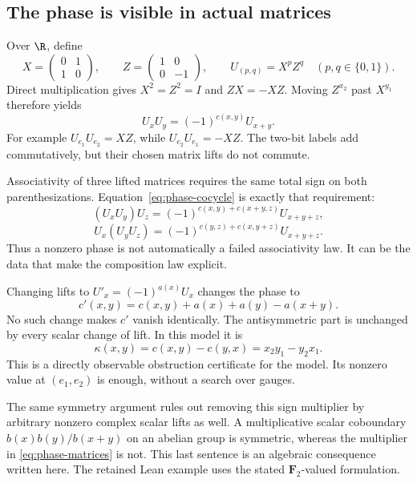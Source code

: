 
\subsection{The phase is visible in actual matrices}
Over \(\R\), define
\[
 X=\begin{pmatrix}0&1\\1&0\end{pmatrix},\qquad
 Z=\begin{pmatrix}1&0\\0&-1\end{pmatrix},\qquad
 U_{(p,q)}=X^pZ^q\quad(p,q\in\{0,1\}).
\]
Direct multiplication gives \(X^2=Z^2=I\) and \(ZX=-XZ\). Moving \(Z^{x_2}\) past \(X^{y_1}\) therefore yields
\begin{equation}\label{eq:phase-matrices}
 U_xU_y=(-1)^{c(x,y)}U_{x+y}.
\end{equation}
For example \(U_{e_1}U_{e_2}=XZ\), while \(U_{e_2}U_{e_1}=-XZ\). The two-bit labels add commutatively, but their chosen matrix lifts do not commute.

Associativity of three lifted matrices requires the same total sign on both parenthesizations. Equation~\eqref{eq:phase-cocycle} is exactly that requirement:
\[
 (U_xU_y)U_z
 =(-1)^{c(x,y)+c(x+y,z)}U_{x+y+z},
\]
\[
 U_x(U_yU_z)
 =(-1)^{c(y,z)+c(x,y+z)}U_{x+y+z}.
\]
Thus a nonzero phase is not automatically a failed associativity law. It can be the data that make the composition law explicit.

Changing lifts to \(U'_x=(-1)^{a(x)}U_x\) changes the phase to
\[
 c'(x,y)=c(x,y)+a(x)+a(y)-a(x+y).
\]
No such change makes \(c'\) vanish identically. The antisymmetric part is unchanged by every scalar change of lift. In this model it is
\[
 \kappa(x,y)=c(x,y)-c(y,x)
            =x_2y_1-y_2x_1.
\]
This is a directly observable obstruction certificate for the model. Its nonzero value at \((e_1,e_2)\) is enough, without a search over gauges.

The same symmetry argument rules out removing this sign multiplier by arbitrary nonzero complex scalar lifts as well. A multiplicative scalar coboundary \(b(x)b(y)/b(x+y)\) on an abelian group is symmetric, whereas the multiplier in \eqref{eq:phase-matrices} is not. This last sentence is an algebraic consequence written here. The retained Lean example uses the stated \(\mathbf F_2\)-valued formulation.

